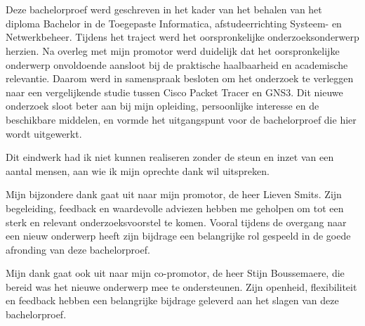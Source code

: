 
\chapter*{}%
\label{ch:voorwoord}


Deze bachelorproef werd geschreven in het kader van het behalen van het diploma Bachelor in de Toegepaste Informatica, afstudeerrichting Systeem- en Netwerkbeheer. Tijdens het traject werd het oorspronkelijke onderzoeksonderwerp herzien. Na overleg met mijn promotor werd duidelijk dat het oorspronkelijke onderwerp onvoldoende aansloot bij de praktische haalbaarheid en academische relevantie. Daarom werd in samenspraak besloten om het onderzoek te verleggen naar een vergelijkende studie tussen Cisco Packet Tracer en GNS3. Dit nieuwe onderzoek sloot beter aan bij mijn opleiding, persoonlijke interesse en de beschikbare middelen, en vormde het uitgangspunt voor de bachelorproef die hier wordt uitgewerkt.

\vspace{0.3cm}

Dit eindwerk had ik niet kunnen realiseren zonder de steun en inzet van een aantal mensen, aan wie ik mijn oprechte dank wil uitspreken.

\vspace{0.3cm}

Mijn bijzondere dank gaat uit naar mijn promotor, de heer Lieven Smits. Zijn begeleiding, feedback en waardevolle adviezen hebben me geholpen om tot een sterk en relevant onderzoeksvoorstel te komen. Vooral tijdens de overgang naar een nieuw onderwerp heeft zijn bijdrage een belangrijke rol gespeeld in de goede afronding van deze bachelorproef.

\vspace{0.3cm}

Mijn dank gaat ook uit naar mijn co-promotor, de heer Stijn Boussemaere, die bereid was het nieuwe onderwerp mee te ondersteunen. Zijn openheid, flexibiliteit en feedback hebben een belangrijke bijdrage geleverd aan het slagen van deze bachelorproef.